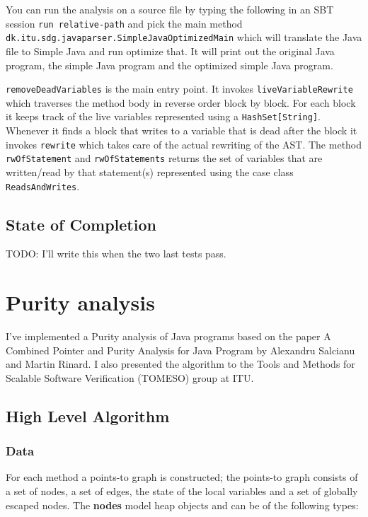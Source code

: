 \documentclass[11pt]{exam}
\begin{document}
You can run the analysis on a source file by typing the following in
an SBT session \texttt{run relative-path} and pick the main method 
\texttt{dk.itu.sdg.javaparser.SimpleJavaOptimizedMain} which will
translate the Java file to Simple Java and run optimize that. It will
print out the original Java program, the simple Java program and the
optimized simple Java program. \newline

\texttt{removeDeadVariables} is the main entry point. It invokes 
\texttt{liveVariableRewrite} which traverses the method body in 
reverse order block by block. For each block it keeps track of 
the live variables represented using a \texttt{HashSet[String]}. 
Whenever it finds a block that writes to a variable that is dead
after the block it invokes \texttt{rewrite} which takes care of 
the actual rewriting of the AST. The method \texttt{rwOfStatement}
and \texttt{rwOfStatements} returns the set of variables that are
written/read by that statement(s) represented using the case class
\texttt{ReadsAndWrites}.

\subsection{State of Completion}

TODO: I'll write this when the two last tests pass.

\newpage

\section{Purity analysis}

I've implemented a Purity analysis of Java programs based on the paper
A Combined Pointer and Purity Analysis for Java Program by Alexandru
Salcianu and Martin Rinard. I also presented the algorithm to the
Tools and Methods for Scalable Software Verification (TOMESO) group at
ITU.

\subsection{High Level Algorithm}

\subsubsection*{Data}

For each method a points-to graph is constructed; the points-to graph
consists of a set of nodes, a set of edges, the state of the local
variables and a set of globally escaped nodes. The \textbf{nodes}
model heap objects and can be of the following types:
\end{document}
